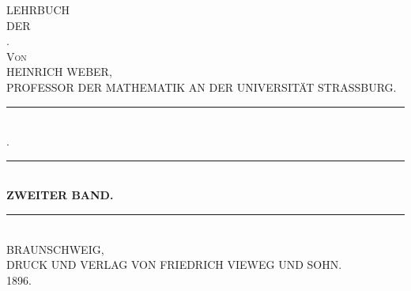 \begin{center}
\vspace*{2cm}
{\LARGE LEHRBUCH}\\[1.2cm]
{\small DER}\\[1.2cm]
{\Huge {}.}\\[2cm]
{\large \textsc{Von}}\\[1.2cm]
{\LARGE HEINRICH WEBER,}\\[0.2cm]
{\footnotesize PROFESSOR DER MATHEMATIK AN DER UNIVERSITÄT STRASSBURG.}\\[1.2cm]
\rule{2.5cm}{0.4pt}\\[1.2cm]
{\large {}.}\\[0.8cm]
\rule{2cm}{0.4pt}\\[0.6cm]
{\large \textbf{ZWEITER BAND.}}\\[3.5cm]
\rule{\textwidth}{1pt}\\[0.8cm]
{\Large BRAUNSCHWEIG,}\\[0.3cm]
{\small DRUCK UND VERLAG VON FRIEDRICH VIEWEG UND SOHN.}\\[0.3cm]
{\Large 1896.}
\end{center}
